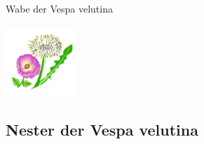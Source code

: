 \documentclass[aspectratio=169]{beamer}
\begin{document}
	\begin{frame}{Wabe der Vespa velutina}
		\begin{center}	
			\includegraphics[width=0.2\textwidth]{figures/BH-Logo_Quat.png}
		\end{center}

		\end{frame}


\subsection[Nester]{Nester der Vespa velutina}
\end{document}
